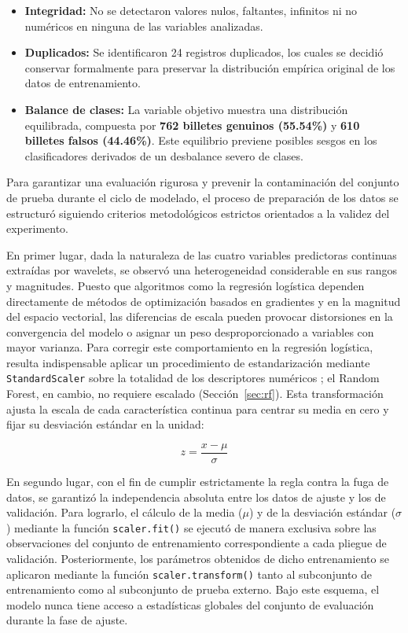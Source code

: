 \documentclass[conference]{IEEEtran}
\begin{document}
	\begin{itemize}
		\item \textbf{Integridad:} No se detectaron valores nulos, faltantes, infinitos ni no numéricos en ninguna de las variables analizadas.
		\item \textbf{Duplicados:} Se identificaron 24 registros duplicados, los cuales se decidió conservar formalmente para preservar la distribución empírica original de los datos de entrenamiento.
		\item \textbf{Balance de clases:} La variable objetivo muestra una distribución equilibrada, compuesta por \textbf{762 billetes genuinos (55.54\%)} y \textbf{610 billetes falsos (44.46\%)}. Este equilibrio previene posibles sesgos en los clasificadores derivados de un desbalance severo de clases.
	\end{itemize}
	
	Para garantizar una evaluación rigurosa y prevenir la contaminación del conjunto de prueba durante el ciclo de modelado, el proceso de preparación de los datos se estructuró siguiendo criterios metodológicos estrictos orientados a la validez del experimento.
	
	En primer lugar, dada la naturaleza de las cuatro variables predictoras continuas extraídas por wavelets, se observó una heterogeneidad considerable en sus rangos y magnitudes. Puesto que algoritmos como la regresión logística dependen directamente de métodos de optimización basados en gradientes y en la magnitud del espacio vectorial, las diferencias de escala pueden provocar distorsiones en la convergencia del modelo o asignar un peso desproporcionado a variables con mayor varianza. Para corregir este comportamiento en la regresión logística, resulta indispensable aplicar un procedimiento de estandarización mediante \texttt{StandardScaler} sobre la totalidad de los descriptores numéricos \cite{datacamp_zscore}; el Random Forest, en cambio, no requiere escalado (Sección~\ref{sec:rf}). Esta transformación ajusta la escala de cada característica continua para centrar su media en cero y fijar su desviación estándar en la unidad:
	
	\begin{equation}
		z = \frac{x - \mu}{\sigma}
	\end{equation}
	
	En segundo lugar, con el fin de cumplir estrictamente la regla contra la fuga de datos, se garantizó la independencia absoluta entre los datos de ajuste y los de validación. Para lograrlo, el cálculo de la media ($\mu$) y de la desviación estándar ($\sigma$) mediante la función \texttt{scaler.fit()} se ejecutó de manera exclusiva sobre las observaciones del conjunto de entrenamiento correspondiente a cada pliegue de validación. Posteriormente, los parámetros obtenidos de dicho entrenamiento se aplicaron mediante la función \texttt{scaler.transform()} tanto al subconjunto de entrenamiento como al subconjunto de prueba externo. Bajo este esquema, el modelo nunca tiene acceso a estadísticas globales del conjunto de evaluación durante la fase de ajuste.
	
\end{document}
